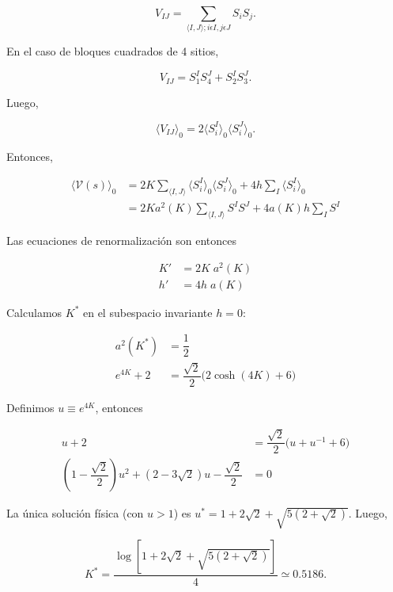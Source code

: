 \documentclass[10pt]{article}
\begin{document}
\begin{equation}
V_{IJ} = \sum_{\langle I,J\rangle; i\epsilon I,j\epsilon J} S_i S_j.
\end{equation}

En el caso de bloques cuadrados de 4 sitios,

\begin{equation}
V_{IJ} = S_1^I S_4^J+  S_2^I S_3^J.
\end{equation}

Luego,

\begin{equation}
\langle V_{IJ}\rangle_0 = 2\langle S_i^I \rangle_0 \langle S_i^J \rangle_0.
\end{equation}

Entonces,


\begin{align}
\langle \mathcal{V}(s)\rangle_0 &= 2K\sum_{\langle I,J\rangle} \langle S_i^I \rangle_0 \langle S_i^J \rangle_0 + 4 h \sum_I  \langle S_i^I \rangle_0 \nonumber \\
&= 2K a^2(K) \sum_{\langle I,J\rangle} S^I S^J +   4 a(K) h \sum_I S^I 
\end{align}

Las ecuaciones de renormalizaci\'on son entonces

\begin{align}
K' &= 2K\;a^2(K) \\
h' &= 4h\;a(K) 
\end{align}

Calculamos $K^*$ en el subespacio invariante $h=0$:

\begin{align}
a^2(K^*) &= \dfrac{1}{2} \\
e^{4K} + 2 &= \dfrac{\sqrt{2}}{2} \bigg( 2\cosh(4K) + 6 \bigg)
\end{align}

Definimos $u \equiv e^{4K}$, entonces

\begin{align}
u + 2 &= \dfrac{\sqrt{2}}{2} \bigg( u + u^{-1} + 6 \bigg) \\
\left(1 - \dfrac{\sqrt{2}}{2}\right) u^2 + \left(2 - 3\sqrt{2}\right) u - \dfrac{\sqrt{2}}{2}&= 0
\end{align}

La \'unica soluci\'on f\'isica (con $u>1$) es $u^* = 1+2\sqrt{2}+\sqrt{5(2+\sqrt{2})}$. Luego, 

\begin{equation}
K^* = \dfrac{\log{\left[1+2\sqrt{2}+\sqrt{5(2+\sqrt{2})}\right]}}{4} \simeq 0.5186.
\end{equation}
\end{document}
